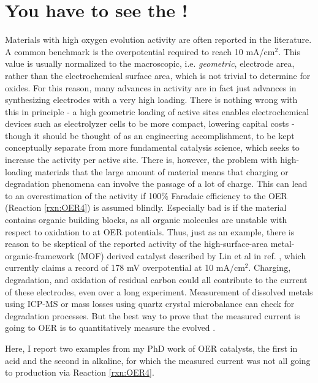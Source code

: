 \section{You have to see the !}\label{sec:see_the_O2}

Materials with high oxygen evolution activity are often reported in the literature. A common benchmark is the overpotential required to reach 10 mA/cm$^2$\cite{McCrory2013, Kibsgaard2019}. This value is usually normalized to the macroscopic, i.e. \textit{geometric}, electrode area, rather than the electrochemical surface area, which is not trivial to determine for oxides. For this reason, many advances in activity are in fact just advances in synthesizing electrodes with a very high loading\cite{Kibsgaard2019}. There is nothing wrong with this in principle - a high geometric loading of active sites enables electrochemical devices such as electrolyzer cells to be more compact, lowering capital costs - though it should be thought of as an engineering accomplishment, to be kept conceptually separate from more fundamental catalysis science, which seeks to increase the activity per active site\cite{Seh2017}. There is, however, the problem with high-loading materials that the large amount of material means that charging or degradation phenomena can involve the passage of a lot of charge. This can lead to an overestimation of the activity if 100\% Faradaic efficiency to the OER (Reaction \ref{rxn:OER4}) is assumed blindly. Especially bad is if the material contains organic building blocks, as all organic molecules are unstable with respect to oxidation to  at OER potentials. Thus, just as an example, there is reason to be skeptical of the reported activity of the high-surface-area metal-organic-framework (MOF) derived  catalyst described by Lin et al in ref. , which currently claims a record\cite{Kibsgaard2019} of 178 mV overpotential at 10 mA/cm$^2$. Charging, degradation, and oxidation of residual carbon could all contribute to the current of these electrodes, even over a long experiment. Measurement of dissolved metals using ICP-MS or mass losses using quartz crystal microbalance can check for degradation processes\cite{Frydendal2014}. But the best way to prove that the measured current is going to OER is to quantitatively measure the evolved . 

Here, I report two examples from my PhD work of OER catalysts, the first in acid and the second in alkaline, for which the measured current was not all going to  production via Reaction \ref{rxn:OER4}.

